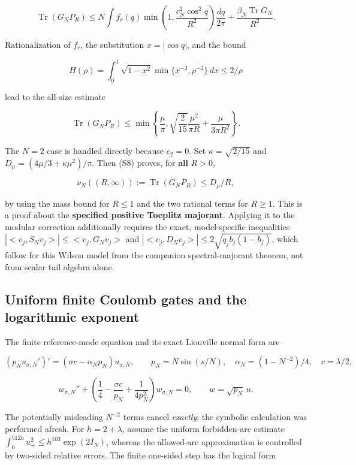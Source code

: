 \documentclass[
  10pt,
  a4paper,
]{article}
\begin{document}
\[
\operatorname{Tr}(G_NP_R)\le N\int f_r(q)
 \min\!\left(1,\frac{c_N^2\cos^2q}{R^2}\right)\frac{dq}{2\pi}
 +\frac{\beta_N\operatorname{Tr}G_N}{R^2}.
\]

Rationalization of \(f_r\), the substitution \(x=|\cos q|\), and the bound

\[
H(\rho)=\int_0^1\sqrt{1-x^2}\min\{x^{-2},\rho^{-2}\}\,dx
\le2/\rho
\]

lead to the all-size estimate

\[
\boxed{\operatorname{Tr}(G_NP_R)\le
 \min\left\{\frac\mu\pi,
 \sqrt{\frac2{15}}\frac{\mu^2}{\pi R}
 +\frac\mu{3\pi R^2}\right\}.}
\tag{S8}
\]

The \(N=2\) case is handled directly because \(c_2=0\). Set \(\kappa=\sqrt{2/15}\) and \(D_\mu=(4\mu/3+\kappa \mu^2)/\pi\). Then (S8) proves, for \textbf{all} \(R>0\),

\[
\nu_N((R,\infty)):=\operatorname{Tr}(G_NP_R)\le D_\mu/R,
\tag{S9}
\]

by using the mass bound for \(R\le 1\) and the two rational terms for \(R\ge 1\). This is a proof about the \textbf{specified positive Toeplitz majorant}. Applying it to the modular correction additionally requires the exact, model-specific inequalities \(|<v_j,S_Nv_j>|\le <v_j,G_Nv_j>\) and \(|<v_j,D_N v_j>|\le 2 \sqrt{q_j b_j(1-b_j)}\), which follow for this Wilson model from the companion spectral-majorant theorem, not from scalar tail algebra alone.

\subsection{Uniform finite Coulomb gates and the logarithmic exponent}\label{uniform-finite-coulomb-gates-and-the-logarithmic-exponent}

The finite reference-mode equation and its exact Liouville normal form are

\[
(p_Nu_{\sigma,N}')'=(\sigma c-\alpha_Np_N)u_{\sigma,N},\qquad
 p_N=N\sin(s/N),\quad\alpha_N=(1-N^{-2})/4,\quad c=\lambda/2,
\]

\[
\boxed{w_{\sigma,N}''+
\left(\frac14-\frac{\sigma c}{p_N}+\frac1{4p_N^2}\right)
 w_{\sigma,N}=0,\qquad w=\sqrt{p_N}\,u.}
\tag{S10}
\]

The potentially misleading \(N^{-2}\) terms cancel \emph{exactly}; the symbolic calculation was performed afresh. For \(h=2+\lambda\), assume the uniform forbidden-arc estimate \(\int_0^{512h}u_+^2\le h^{103}\exp(2 I_N)\), whereas the allowed-arc approximation is controlled by two-sided relative errors. The finite one-sided step has the logical form
\end{document}
